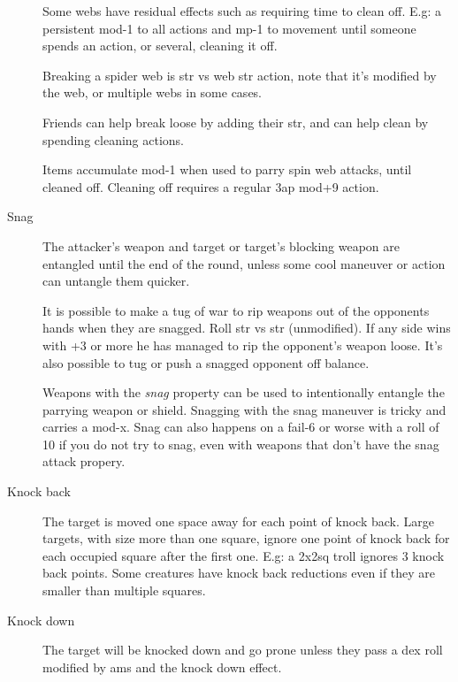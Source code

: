 \begin{description}
Some webs have residual effects such as requiring time to clean off. E.g: a persistent mod-1 to all actions and mp-1 to movement until someone spends an action, or several, cleaning it off.

Breaking a spider web is str vs web str action, note that it's modified by the web, or multiple webs in some cases.

Friends can help break loose by adding their str, and can help clean by spending cleaning actions.

Items accumulate mod-1 when used to parry spin web attacks, until cleaned off. Cleaning off requires a regular 3ap mod+9 action.


\item[Snag]
The attacker's weapon and target or target's blocking weapon are entangled until the end of the round, unless some cool maneuver or action can untangle them quicker.

It is possible to make a tug of war to rip weapons out of the opponents hands when they are snagged. Roll str vs str (unmodified). If any side wins with +3 or more he has managed to rip the opponent's weapon loose. It's also possible to tug or push a snagged opponent off balance.

Weapons with the \emph{snag} property can be used to intentionally entangle the parrying weapon or shield. Snagging with the snag maneuver is tricky and carries a mod-x. Snag can also happens on a fail-6 or worse with a roll of 10 if you do not try to snag, even with weapons that don't have the snag attack propery.


\item[Knock back]
The target is moved one space away for each point of knock back. 
Large targets, with size more than one square, ignore one point of knock back for each occupied square after the first one. E.g: a 2x2sq troll ignores 3 knock back points.
Some creatures have knock back reductions even if they are smaller than multiple squares.


\item[Knock down]
The target will be knocked down and go prone unless they pass a dex roll modified by ams and the knock down effect.


\end{description}






%


